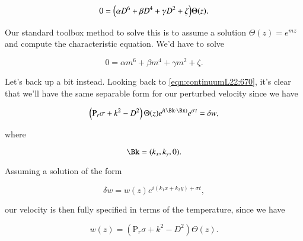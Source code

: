 \begin{equation}\label{eqn:continuumL22:890}
0 = \Bigl( \alpha D^6 + \beta D^4 + \gamma D^2 + \zeta \Bigr) \Theta(z).
\end{equation}

Our standard toolbox method to solve this is to assume a solution $\Theta(z) = e^{m z}$ and compute the characteristic equation.  We'd have to solve

\begin{equation}\label{eqn:continuumL22:910}
0 = \alpha m^6 + \beta m^4 + \gamma m^2 + \zeta.
\end{equation}

Let's back up a bit instead.  Looking back to \ref{eqn:continuumL22:670}, it's clear that we'll have the same separable form for our perturbed velocity since we have

\begin{equation}\label{eqn:continuumL22:670}
\left( \text{P}_r \sigma + k^2 - D^2 \right) \Theta(z) e^{i (\Bk \cdot \Bx) } e^{\sigma t} = \delta w,
\end{equation}

where

\begin{equation}\label{eqn:continuumL22:930}
\Bk = (k_x, k_y, 0).
\end{equation}

Assuming a solution of the form

\begin{equation}\label{eqn:continuumL22:950}
\delta w = w(z) e^{ i ( k_1 x + k_2 y) + \sigma t},
\end{equation}

our velocity is then fully specified in terms of the temperature, since we have

\begin{equation}\label{eqn:continuumL22:970}
w(z) = \left( \text{P}_r \sigma + k^2 - D^2 \right) \Theta(z).
\end{equation}

%
%
%
%
%
%
%
%
%
%

